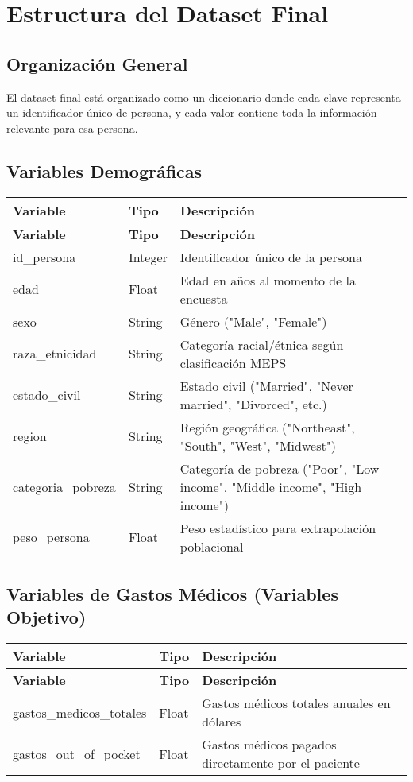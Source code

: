 \documentclass[12pt,a4paper]{article}
\begin{document}
\section{Estructura del Dataset Final}

\subsection{Organización General}
El dataset final está organizado como un diccionario donde cada clave representa un identificador único de persona, y cada valor contiene toda la información relevante para esa persona.

\subsection{Variables Demográficas}
\begin{longtable}{|p{4cm}|p{2cm}|p{8cm}|}
\hline
\textbf{Variable} & \textbf{Tipo} & \textbf{Descripción} \\
\hline
\endfirsthead
\hline
\textbf{Variable} & \textbf{Tipo} & \textbf{Descripción} \\
\hline
\endhead
id\_persona & Integer & Identificador único de la persona \\
\hline
edad & Float & Edad en años al momento de la encuesta \\
\hline
sexo & String & Género ("Male", "Female") \\
\hline
raza\_etnicidad & String & Categoría racial/étnica según clasificación MEPS \\
\hline
estado\_civil & String & Estado civil ("Married", "Never married", "Divorced", etc.) \\
\hline
region & String & Región geográfica ("Northeast", "South", "West", "Midwest") \\
\hline
categoria\_pobreza & String & Categoría de pobreza ("Poor", "Low income", "Middle income", "High income") \\
\hline
peso\_persona & Float & Peso estadístico para extrapolación poblacional \\
\hline
\end{longtable}

\subsection{Variables de Gastos Médicos (Variables Objetivo)}
\begin{longtable}{|p{4cm}|p{2cm}|p{8cm}|}
\hline
\textbf{Variable} & \textbf{Tipo} & \textbf{Descripción} \\
\hline
\endfirsthead
\hline
\textbf{Variable} & \textbf{Tipo} & \textbf{Descripción} \\
\hline
\endhead
gastos\_medicos\_totales & Float & Gastos médicos totales anuales en dólares \\
\hline
gastos\_out\_of\_pocket & Float & Gastos médicos pagados directamente por el paciente \\
\hline
\end{longtable}
\end{document}
